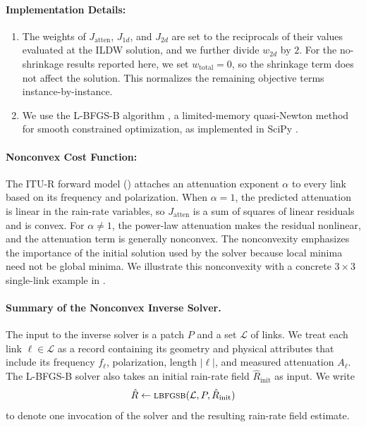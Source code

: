 \documentclass[a4paper,fleqn]{cas-sc}
\DeclareRobustCommand{\LBFGSB}{\textsc{lbfgsb}}
\begin{document}
\paragraph{Implementation Details:}
\begin{enumerate}
  \item
        The weights of $J_{\mathrm{atten}}$, $J_{1d}$, and $J_{2d}$ are set to the reciprocals of their values evaluated at the ILDW solution, and we further divide $w_{2d}$ by $2$. For the no-shrinkage results reported here, we set $w_{\mathrm{total}}=0$, so the shrinkage term does not affect the solution. This normalizes the remaining objective terms instance-by-instance.
  \item
        We use the L-BFGS-B algorithm \citep{byrd1995limited,zhu1997algorithm}, a limited-memory quasi-Newton method for smooth constrained optimization, as implemented in SciPy \citep{scipy}.
\end{enumerate}

\paragraph{Nonconvex Cost Function:}
The ITU-R forward model () attaches an attenuation exponent $\alpha$ to every link based on its frequency and polarization.
When $\alpha=1$, the predicted attenuation is linear in the rain-rate variables, so
$J_{\mathrm{atten}}$ is a sum of squares of linear residuals and is convex.
For $\alpha\neq 1$, the power-law attenuation makes the residual nonlinear,
and the attenuation term is generally nonconvex.
The nonconvexity emphasizes the importance of the initial solution used by the solver because local minima need not be global minima. We illustrate this nonconvexity with a concrete $3\times3$ single-link example in .

\paragraph{Summary of the Nonconvex Inverse Solver.}
The input to the inverse solver is a patch $P$ and a set $\mathcal{L}$ of links.
We treat each link $\ell\in\mathcal{L}$ as a record containing its geometry and physical attributes that include its frequency $f_\ell$, polarization, length $|\ell|$, and measured attenuation $A_\ell$.
The L-BFGS-B solver also takes an initial rain-rate field $\hat{R}_{\mathrm{init}}$ as input.
We write
\[
  \hat{R}\gets \LBFGSB(\mathcal{L},P,\hat{R}_{\mathrm{init}})
\]
to denote one invocation of the solver and the resulting rain-rate field estimate.
\end{document}
